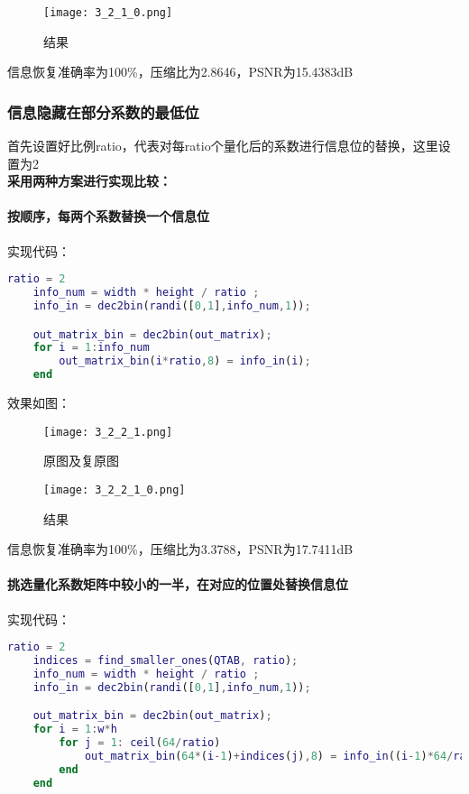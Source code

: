 \documentclass[12pt]{article}
\newcommand{\subsubsubsection}[1]{\paragraph{#1}\mbox{}}
\begin{document}
\begin{figure}[H]
    \centering
    \texttt{[image: 3\_2\_1\_0.png]}
    \caption{结果}
\end{figure}

信息恢复准确率为100\%，压缩比为2.8646，PSNR为15.4383dB

\subsubsection{信息隐藏在部分系数的最低位}

首先设置好比例ratio，代表对每ratio个量化后的系数进行信息位的替换，这里设置为2\\
\hspace*{2em}\textbf{采用两种方案进行实现比较：}
\subsubsubsection{按顺序，每两个系数替换一个信息位}

\hspace*{2em}实现代码：
\begin{lstlisting}[language=matlab]
    ratio = 2
    info_num = width * height / ratio ;
    info_in = dec2bin(randi([0,1],info_num,1));

    out_matrix_bin = dec2bin(out_matrix);
    for i = 1:info_num
        out_matrix_bin(i*ratio,8) = info_in(i);
    end
\end{lstlisting}

效果如图：
\begin{figure}[H]
    \centering
    \texttt{[image: 3\_2\_2\_1.png]}
    \caption{原图及复原图}
\end{figure}

\begin{figure}[H]
    \centering
    \texttt{[image: 3\_2\_2\_1\_0.png]}
    \caption{结果}
\end{figure}

信息恢复准确率为100\%，压缩比为3.3788，PSNR为17.7411dB\\
\subsubsubsection{挑选量化系数矩阵中较小的一半，在对应的位置处替换信息位}

实现代码：
\begin{lstlisting}[language=matlab]
    ratio = 2
    indices = find_smaller_ones(QTAB, ratio);
    info_num = width * height / ratio ;
    info_in = dec2bin(randi([0,1],info_num,1));

    out_matrix_bin = dec2bin(out_matrix);
    for i = 1:w*h
        for j = 1: ceil(64/ratio)
            out_matrix_bin(64*(i-1)+indices(j),8) = info_in((i-1)*64/ratio+j);
        end
    end
\end{lstlisting}
\end{document}
